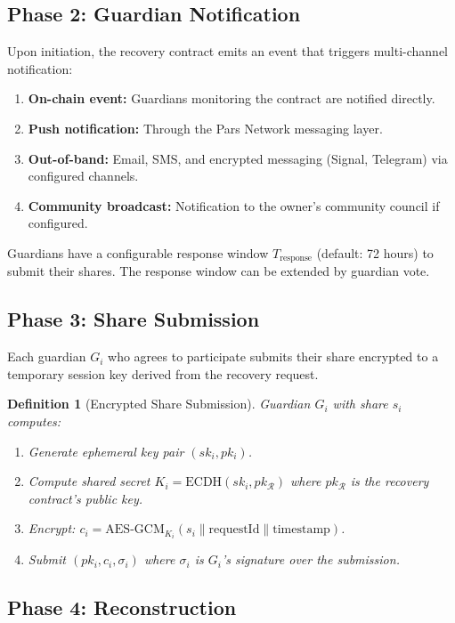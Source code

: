 \documentclass[11pt,a4paper,twocolumn]{article}
\newtheorem{definition}[theorem]{Definition}
\begin{document}
\subsection{Phase 2: Guardian Notification}

Upon initiation, the recovery contract emits an event that triggers multi-channel notification:

\begin{enumerate}
  \item \textbf{On-chain event:} Guardians monitoring the contract are notified directly.
  \item \textbf{Push notification:} Through the Pars Network messaging layer.
  \item \textbf{Out-of-band:} Email, SMS, and encrypted messaging (Signal, Telegram) via configured channels.
  \item \textbf{Community broadcast:} Notification to the owner's community council if configured.
\end{enumerate}

Guardians have a configurable response window $T_{\text{response}}$ (default: 72 hours) to submit their shares. The response window can be extended by guardian vote.

\subsection{Phase 3: Share Submission}

Each guardian $G_i$ who agrees to participate submits their share encrypted to a temporary session key derived from the recovery request.

\begin{definition}[Encrypted Share Submission]
Guardian $G_i$ with share $s_i$ computes:
\begin{enumerate}
  \item Generate ephemeral key pair $(sk_i, pk_i)$.
  \item Compute shared secret $K_i = \text{ECDH}(sk_i, pk_{\mathcal{R}})$ where $pk_{\mathcal{R}}$ is the recovery contract's public key.
  \item Encrypt: $c_i = \text{AES-GCM}_{K_i}(s_i \| \text{requestId} \| \text{timestamp})$.
  \item Submit $(pk_i, c_i, \sigma_i)$ where $\sigma_i$ is $G_i$'s signature over the submission.
\end{enumerate}
\end{definition}

\subsection{Phase 4: Reconstruction}
\end{document}
